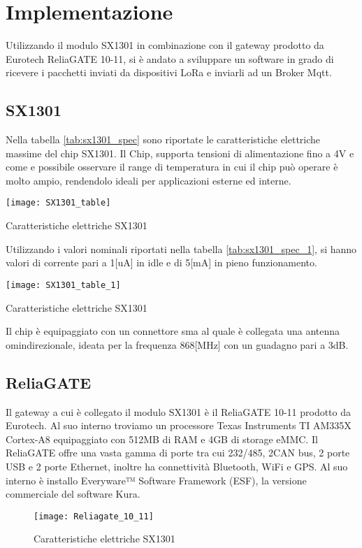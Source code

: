 \section{Implementazione}
Utilizzando il modulo SX1301 in combinazione con il gateway prodotto da Eurotech
ReliaGATE 10-11, si è andato a sviluppare un software in grado di ricevere i
pacchetti inviati da dispositivi LoRa e inviarli ad un Broker Mqtt.

\subsection{SX1301}
Nella tabella \ref{tab:sx1301_spec} sono riportate le caratteristiche elettriche
massime del  chip SX1301. Il Chip, supporta tensioni di
alimentazione fino a 4V e  come e possibile osservare il range di temperatura in cui il
chip può operare è molto ampio, rendendolo ideali per applicazioni esterne ed
interne. 

\begin{table}[h]
\centering 
\texttt{[image: SX1301\_table]}
\caption{Caratteristiche elettriche SX1301}
\label{tab:sx1301_spec}
\end{table}
Utilizzando i valori nominali riportati nella tabella \ref{tab:sx1301_spec_1},
si hanno valori di corrente pari a 1[uA] in idle  e di 5[mA] in pieno
funzionamento.
\begin{table}[h]
\centering 
\texttt{[image: SX1301\_table\_1]}
\caption{Caratteristiche elettriche SX1301}
\label{tab:sx1301_spec_1}
\end{table}
Il chip è equipaggiato con un connettore sma al quale è collegata una
antenna omindirezionale, ideata per la frequenza 868[MHz] con un guadagno pari a 3dB.
\subsection{ReliaGATE}
Il gateway a cui è collegato il modulo SX1301 è il ReliaGATE 10-11 prodotto da
Eurotech. Al suo interno troviamo un processore Texas Instruments TI AM335X Cortex-A8 
equipaggiato con 512MB di RAM e 4GB di storage eMMC. Il ReliaGATE offre una
vasta gamma di porte tra cui 232/485, 2CAN bus, 2 porte USB e 2 porte Ethernet,
inoltre ha connettività Bluetooth, WiFi e GPS. Al suo interno è installo
Everyware™ Software Framework (ESF), la versione commerciale del software Kura.
\begin{figure}[h]
\centering 
\texttt{[image: Reliagate\_10\_11]}
\caption{Caratteristiche elettriche SX1301}
\label{fig:ReliaGATE}
\end{figure}


